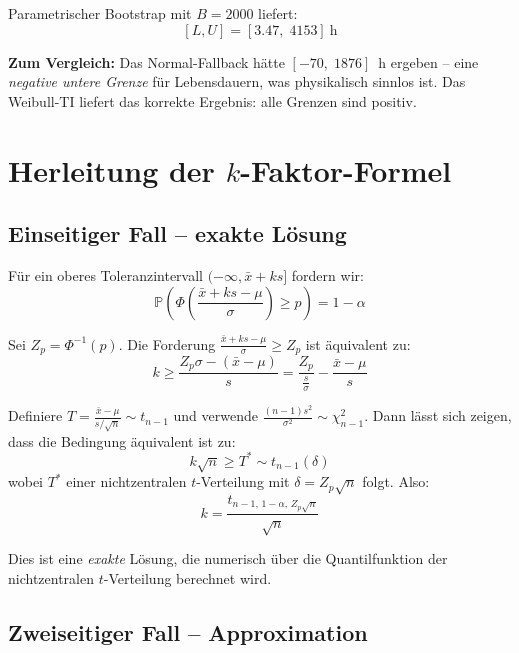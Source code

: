 \documentclass[10pt,a4paper,twocolumn]{article}
\theoremstyle{definition}
\newcommand{\TI}{Toleranzintervall}
\newcommand{\Prob}{\mathbb{P}}
\newcommand{\xbar}{\bar{x}}
\begin{document}
Parametrischer Bootstrap mit $B = 2000$ liefert:
\[
    [L, U] = [3.47,\; 4153]~\text{h}
\]

\textbf{Zum Vergleich:} Das Normal-Fallback hätte
$[-70,\; 1876]$~h ergeben -- eine \emph{negative untere
Grenze} für Lebensdauern, was physikalisch sinnlos ist.
Das Weibull-TI liefert das korrekte Ergebnis: alle Grenzen
sind positiv.


\section{Herleitung der $k$-Faktor-Formel}
\label{sec:herleitung}

\subsection{Einseitiger Fall -- exakte Lösung}

Für ein oberes \TI{} $(-\infty, \xbar + ks]$ fordern wir:
\begin{equation}
    \Prob\!\left(\Phi\!\left(\frac{\xbar + ks - \mu}{\sigma}\right)
    \geq p\right) = 1 - \alpha
    \label{eq:k_derive_1}
\end{equation}

Sei $Z_p = \Phi^{-1}(p)$. Die Forderung
$\frac{\xbar + ks - \mu}{\sigma} \geq Z_p$ ist äquivalent zu:
\begin{equation}
    k \geq \frac{Z_p \sigma - (\xbar - \mu)}{s}
    = \frac{Z_p}{\frac{s}{\sigma}} - \frac{\xbar - \mu}{s}
\end{equation}

Definiere $T = \frac{\xbar - \mu}{s/\sqrt{n}} \sim t_{n-1}$
und verwende $\frac{(n-1)s^2}{\sigma^2} \sim \chi^2_{n-1}$.
Dann lässt sich zeigen, dass die Bedingung äquivalent ist zu:
\begin{equation}
    k\sqrt{n} \geq T^* \sim t_{n-1}(\delta)
\end{equation}
wobei $T^*$ einer nichtzentralen $t$-Verteilung mit
$\delta = Z_p\sqrt{n}$ folgt. Also:
\begin{equation}
    k = \frac{t_{n-1,\,1-\alpha,\,Z_p\sqrt{n}}}{\sqrt{n}}
\end{equation}

Dies ist eine \emph{exakte} Lösung, die numerisch über die
Quantilfunktion der nichtzentralen $t$-Verteilung berechnet wird.

\subsection{Zweiseitiger Fall -- Approximation}
\end{document}
